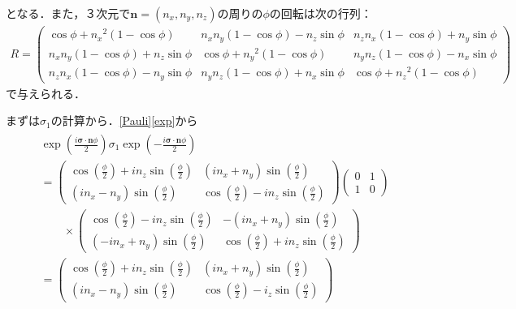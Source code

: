 \documentclass[a4paper]{ltjsreport}
\begin{document}
となる．また，３次元で$\boldsymbol{n}=(n_x,n_y,n_z)$の周りの$\phi$の回転は次の行列：
\begin{align}
  R=\left(
  \begin{array}{ccc}
    \cos\phi+n_x{}^2(1-\cos\phi) & n_x n_y(1-\cos\phi)-n_z\sin\phi & n_z n_x(1-\cos\phi)+n_y\sin\phi \\
    n_x n_y(1-\cos\phi)+n_z\sin\phi &  \cos\phi+n_y{}^2(1-\cos\phi) & n_y n_z(1-\cos\phi)-n_x\sin\phi \\
    n_z n_x(1-\cos\phi)-n_y\sin\phi &  n_y n_z(1-\cos\phi)+n_x\sin\phi & \cos\phi+n_z{}^2(1-\cos\phi)
  \end{array}
  \right)
  \label{Rodriguez}
\end{align}
で与えられる．

まずは$\sigma_1$の計算から．\eqref{Pauli}\eqref{exp}から
\begin{align}
  \begin{split}
    & \exp\left(\frac{i\boldsymbol{\sigma}\cdot\boldsymbol{n}\phi}{2}\right)\sigma_1\exp\left(-\frac{i\boldsymbol{\sigma}\cdot\boldsymbol{n}\phi}{2}\right)\\
    & =
    \begin{pmatrix}
      \cos\left(\frac{\phi}{2}\right)+in_z\sin\left(\frac{\phi}{2}\right) & (in_x+n_y)\sin\left(\frac{\phi}{2}\right) \\
      (in_x-n_y)\sin\left(\frac{\phi}{2}\right) & \cos\left(\frac{\phi}{2}\right)-in_z\sin\left(\frac{\phi}{2}\right)
    \end{pmatrix}
    \begin{pmatrix}
      0 & 1 \\
      1 & 0
    \end{pmatrix}
    \\
    & \qquad\times
    \begin{pmatrix}
      \cos\left(\frac{\phi}{2}\right)-in_z\sin\left(\frac{\phi}{2}\right) & -(in_x+n_y)\sin\left(\frac{\phi}{2}\right) \\
      (-in_x+n_y)\sin\left(\frac{\phi}{2}\right) & \cos\left(\frac{\phi}{2}\right)+in_z\sin\left(\frac{\phi}{2}\right)
    \end{pmatrix}
    \\
    & =
    \begin{pmatrix}
      \cos\left(\frac{\phi}{2}\right)+in_z\sin\left(\frac{\phi}{2}\right) & (in_x+n_y)\sin\left(\frac{\phi}{2}\right)\\
      (in_x-n_y)\sin\left(\frac{\phi}{2}\right) & \cos\left(\frac{\phi}{2}\right)-i_z\sin\left(\frac{\phi}{2}\right)

\end{pmatrix}
\end{split}
\end{align}
\end{document}
